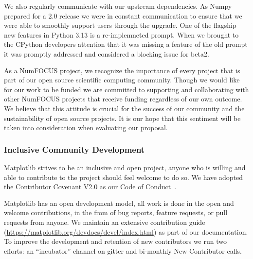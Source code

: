\documentclass[12pt]{article}
\numberwithin{page}{section}
\begin{document}
We also regularly communicate with our upstream dependencies.  As Numpy
prepared for a 2.0 release we were in constant communication to ensure that we
were able to smoothly support users through the upgrade.  One of the flagship
new features in Python 3.13 is a re-implemneted prompt.  When we brought to the
CPython developers attention that it was missing a feature of the old prompt it
was promptly addressed and considered a blocking issue for beta2.

As a NumFOCUS project, we recognize the importance of every project
that is part of our open source scientific computing community. Though
we would like for our work to be funded we are committed to supporting
and collaborating with other NumFOCUS projects that receive funding
regardless of our own outcome. We believe that this attitude is
crucial for the success of our community and the sustainability of
open source projects. It is our hope that this sentiment will be taken
into consideration when evaluating our proposal.


\subsubsection{Inclusive Community Development}


Matplotlib strives to be an inclusive and open project, anyone who is
willing and able to contribute to the project should feel welcome to
do so.  We have adopted the Contributor Covenant V2.0 as
our Code of Conduct~\cite{CoC}.

Matplotlib has an open development model, all work is done in the open and
welcome contributions, in the from of bug reports, feature requests, or pull
requests from anyone.  We maintain an extensive contribution guide
(\url{https://matplotlib.org/devdocs/devel/index.html}) as part of our
documentation.  To improve the development and retention of new contributors we
run two efforts: an ``incubator'' channel on gitter and bi-monthly New
Contributor calls.
\end{document}
